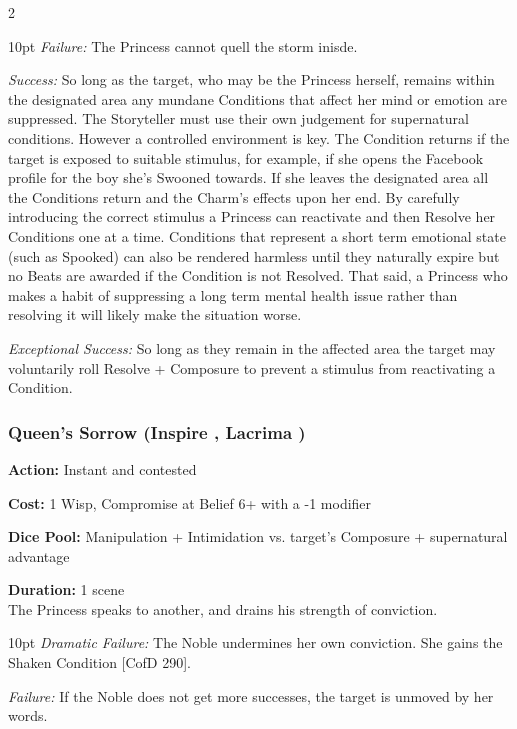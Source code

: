 \begin{multicols}{2}
\begin{myindentpar}{10pt}
    \emph{Failure:} The Princess cannot quell the storm inisde. 

    \emph{Success:} So long as the target, who may be the Princess herself, remains within the designated area any mundane Conditions that affect her mind or emotion are suppressed. The Storyteller must use their own judgement for supernatural conditions. However a controlled environment is key. The Condition returns if the target is exposed to suitable stimulus, for example, if she opens the Facebook profile for the boy she's Swooned towards. If she leaves the designated area all the Conditions return and the Charm's effects upon her end. By carefully introducing the correct stimulus a Princess can reactivate and then Resolve her Conditions one at a time. Conditions that represent a short term emotional state (such as Spooked) can also be rendered harmless until they naturally expire but no Beats are awarded if the Condition is not Resolved. That said, a Princess who makes a habit of suppressing a long term mental health issue rather than resolving it will likely make the situation worse. 

    \emph{Exceptional Success:} So long as they remain in the affected area the target may voluntarily roll Resolve + Composure to prevent a stimulus from reactivating a Condition. 

\end{myindentpar}


\subsubsection*{Queen's Sorrow (Inspire \textbullet\textbullet, Lacrima \textbullet\textbullet)}

\noindent \textbf{Action:} Instant and contested

\noindent \textbf{Cost:} 1 Wisp, Compromise at Belief 6+ with a -1 modifier

\noindent \textbf{Dice Pool:} Manipulation + Intimidation vs. target's Composure + supernatural advantage

\noindent \textbf{Duration:} 1 scene \\ 

\noindent The Princess speaks to another, and drains his strength of conviction.

\begin{myindentpar}{10pt}    \emph{Dramatic Failure:}  The Noble undermines her own conviction. She gains the Shaken Condition [CofD 290].

    \emph{Failure:}  If the Noble does not get more successes, the target is unmoved by her words.


\end{myindentpar}
\end{multicols}
